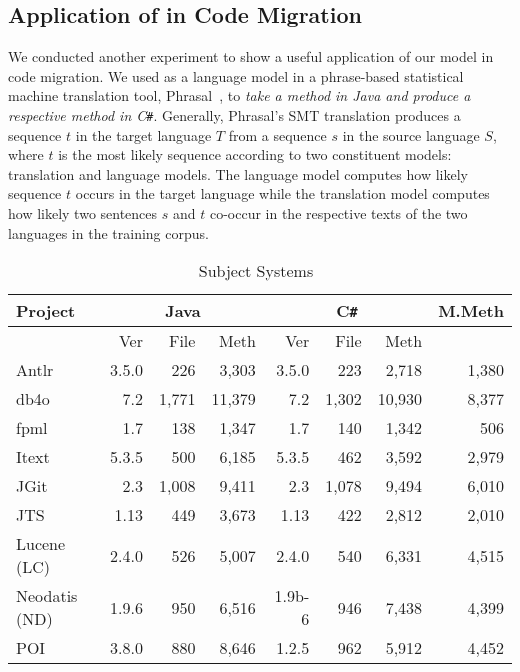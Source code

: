\subsection{Application of {\tool} in Code Migration}

We conducted another experiment to show a useful application of our
model in code migration. We used {\tool} as a language model in a
phrase-based statistical machine translation tool,
Phrasal~\cite{phrasal10}, to {\em take a method in Java and produce a
  respective method in C\texttt{\#}}. Generally, Phrasal's SMT
translation produces a sequence $t$ in the target language $T$ from a
sequence $s$ in the source language $S$, where $t$ is the most likely
sequence according to two constituent models: translation and language
models. The language model computes how likely sequence $t$ occurs in
the target language while the translation model computes how likely
two sentences $s$ and $t$ co-occur in the respective texts of the
two languages in the training corpus.

\begin{table}[t]
	\footnotesize
	\tabcolsep 2.5pt
  \centering
  \caption{Subject Systems~\cite{ase15}}
    \begin{tabular}{l|rrr|rrr|r}
    \toprule
    Project & \multicolumn{3}{c}{Java} \vline& \multicolumn{3}{c}{C\texttt{\#}} \vline& M.Meth \\
    \hline
		& Ver   &File 		&Meth 	&Ver 			&File 		&Meth 		&  \\
		\hline					
    Antlr~\cite{Antlr} 		   & 3.5.0 & 226   	& 3,303  & 3.5.0 	& 223   	& 2,718  	& 1,380 \\
    db4o~\cite{db4o}  		   & 7.2   & 1,771 	& 11,379 & 7.2   	& 1,302  	& 10,930 	& 8,377 \\
    fpml~\cite{fpml}  		   & 1.7   & 138   	& 1,347  & 1.7   	& 140   	& 1,342  	& 506 \\
    Itext~\cite{Itext} 		   & 5.3.5 & 500   	& 6,185  & 5.3.5 	& 462   	& 3,592  	& 2,979 \\
    JGit~\cite{JGit}  		   & 2.3   & 1,008 	& 9,411  & 2.3   	& 1,078  	& 9,494  	& 6,010 \\
    JTS~\cite{JTS}   		   & 1.13  & 449   	& 3,673  & 1.13  	& 422   	& 2,812  	& 2,010 \\
    Lucene (LC)~\cite{Lucene}  	   & 2.4.0 & 526   	& 5,007  & 2.4.0 	& 540   	& 6,331  	& 4,515 \\
    Neodatis (ND)~\cite{Neodatis}       & 1.9.6 & 950   	& 6,516  & 1.9b-6       & 946           & 7,438 	& 4,399 \\
    POI~\cite{POI}   		   & 3.8.0 & 880        & 8,646  & 1.2.5 	& 962   	& 5,912  	& 4,452 \\
    \bottomrule
    \end{tabular}%
  \label{tab:systems}%
\end{table}%




